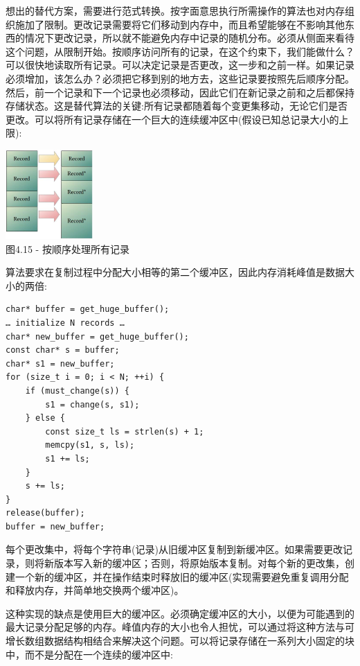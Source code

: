 想出的替代方案，需要进行范式转换。按字面意思执行所需操作的算法也对内存组织施加了限制。更改记录需要将它们移动到内存中，而且希望能够在不影响其他东西的情况下更改记录，所以就不能避免内存中记录的随机分布。必须从侧面来看待这个问题，从限制开始。按顺序访问所有的记录，在这个约束下，我们能做什么？可以很快地读取所有记录。可以决定记录是否更改，这一步和之前一样。如果记录必须增加，该怎么办？必须把它移到别的地方去，这些记录要按照先后顺序分配。然后，前一个记录和下一个记录也必须移动，因此它们在新记录之前和之后都保持存储状态。这是替代算法的关键:所有记录都随着每个变更集移动，无论它们是否更改。可以将所有记录存储在一个巨大的连续缓冲区中(假设已知总记录大小的上限):

\begin{center}
\includegraphics[width=0.25\textwidth]{content/1/chapter4/images/15.jpg}\\
图4.15 - 按顺序处理所有记录
\end{center}

算法要求在复制过程中分配大小相等的第二个缓冲区，因此内存消耗峰值是数据大小的两倍:

\begin{lstlisting}[style=styleCXX]
char* buffer = get_huge_buffer();
… initialize N records …
char* new_buffer = get_huge_buffer();
const char* s = buffer;
char* s1 = new_buffer;
for (size_t i = 0; i < N; ++i) {
	if (must_change(s)) {
		s1 = change(s, s1);
	} else {
		const size_t ls = strlen(s) + 1;
		memcpy(s1, s, ls);
		s1 += ls;
	}
	s += ls;
}
release(buffer);
buffer = new_buffer;
\end{lstlisting}

每个更改集中，将每个字符串(记录)从旧缓冲区复制到新缓冲区。如果需要更改记录，则将新版本写入新的缓冲区；否则，将原始版本复制。对每个新的更改集，创建一个新的缓冲区，并在操作结束时释放旧的缓冲区(实现需要避免重复调用分配和释放内存，并简单地交换两个缓冲区)。

这种实现的缺点是使用巨大的缓冲区。必须确定缓冲区的大小，以便为可能遇到的最大记录分配足够的内存。峰值内存的大小也令人担忧，可以通过将这种方法与可增长数组数据结构相结合来解决这个问题。可以将记录存储在一系列大小固定的块中，而不是分配在一个连续的缓冲区中:

